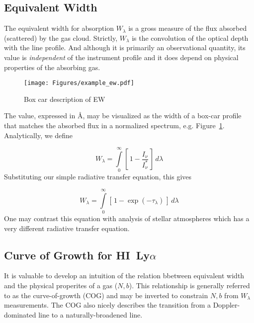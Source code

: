 \documentclass[graybox]{svmult}
\newcommand{\HI}{H{\sc I}}
\def\lya{Ly$\alpha$}
\def\ltk{\left [ \,}
\def\rtk{\, \right  ] }
\def\intl{\int\limits}
\begin{document}
\subsection{Equivalent Width}
\label{subsec:EW}

The equivalent width for absorption 
$W_\lambda$ is a gross measure of the 
flux absorbed (scattered) by the gas cloud.
Strictly, $W_\lambda$ is the convolution of the 
optical depth with the line profile.  
And although it is primarily an observational quantity,
its value is {\it independent} of the instrument profile
and it does depend on physical properties of the
absorbing gas.


%
\begin{figure}[b]
\sidecaption
\texttt{[image: Figures/example\_ew.pdf]}
%
%
\caption{Box car description of EW
}
\label{fig:EWbox}       %
\end{figure}

The value, expressed in \AA, may be
visualized as the width of a box-car profile
that matches the absorbed flux in a normalized 
spectrum, e.g. Figure~\ref{fig:EWbox}.
Analytically, we define

\begin{equation}
W_\lambda = \intl_0^\infty \ltk 1 - \frac{I_\nu}{I_\nu^*} \rtk \, d\lambda
\end{equation}
Substituting our simple radiative transfer equation, this gives

\begin{equation}
W_\lambda = \intl_0^\infty \ltk 1 - \exp(-\tau_\lambda) \rtk \, d\lambda
\label{eqn:EW}
\end{equation}
One may contrast this equation with analysis of stellar 
atmospheres which has
a very different radiative transfer equation.

\subsection{Curve of Growth for \HI\ \lya}
\label{subsec:COGlya}

It is valuable to develop an intuition 
of the relation bbetween equivalent width and the
physical properites of a gas ($N,b$).  This 
relationship is generally referred to as the
curve-of-growth (COG) and may be inverted to
constrain $N,b$ from $W_\lambda$ measurements.
The COG also nicely describes the transition from a 
Doppler-dominated line to a naturally-broadened line.
\end{document}
